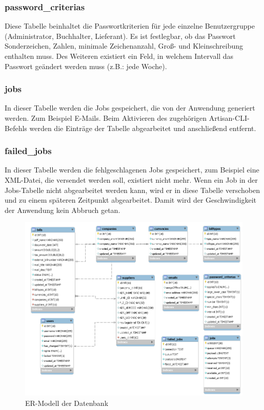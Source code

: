 \subsubsection{password\_criterias}
Diese Tabelle beinhaltet die Passwortkriterien für jede einzelne Benutzergruppe (Administrator, Buchhalter, Lieferant). Es ist festlegbar, ob das Passwort Sonderzeichen, Zahlen, minimale Zeichenanzahl, Groß- und Kleinschreibung enthalten muss. Des Weiteren existiert ein Feld, in welchem Intervall das Passwort geändert werden muss (z.B.: jede Woche).

\subsubsection{jobs}
In dieser Tabelle werden die Jobs gespeichert, die von der Anwendung generiert werden. Zum Beispiel E-Mails. Beim Aktivieren des zugehörigen Artisan-CLI-Befehls werden die Einträge der Tabelle abgearbeitet und anschließend entfernt.
\subsubsection{failed\_jobs}
In dieser Tabelle werden die fehlgeschlagenen Jobs gespeichert, zum Beispiel eine XML-Datei, die versendet werden soll, existiert nicht mehr. Wenn ein Job in der Jobs-Tabelle nicht abgearbeitet werden kann, wird er in diese Tabelle verschoben und zu einem späteren Zeitpunkt abgearbeitet. Damit wird der Geschwindigkeit der Anwendung kein Abbruch getan.

\begin{figure}
\centering
\includegraphics[scale=0.9]{figures/datenbank.PNG}
\caption{ER-Modell der Datenbank}
\label{fig:ermodell} 
\end{figure}